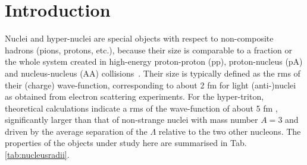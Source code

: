 \section{Introduction} 
Nuclei and hyper-nuclei are special objects with respect to non-composite hadrons (pions, protons, etc.), because their size is comparable to a fraction or the whole system created in high-energy proton-proton (pp), proton-nucleus (pA) and nucleus-nucleus (AA) collisions~\cite{Adam:2015vna}.  
Their size is typically defined as the rms of their (charge) wave-function, corresponding to about 2 fm for light (anti-)nuclei as obtained from electron scattering experiments. 
For the hyper-triton, theoretical calculations indicate a rms of the wave-function of about 5 fm \cite{Nemura:1999qp}, significantly larger than that of non-strange nuclei with mass number $A = 3$ and driven by the average separation of the $\Lambda$ relative to the two other nucleons.
The properties of the objects under study here are summarised in Tab. \ref{tab:nucleusradii}.

